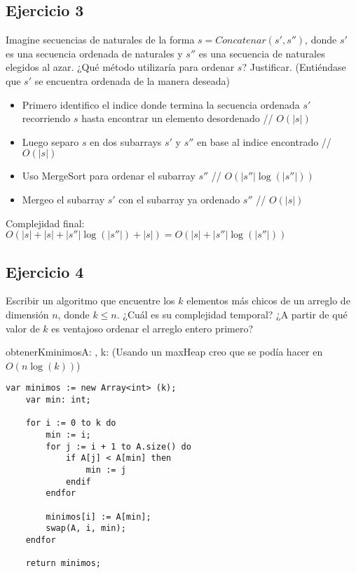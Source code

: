 \subsection{Ejercicio 3}
Imagine secuencias de naturales de la forma $s = Concatenar(s', s'')$, donde $s'$ es una secuencia ordenada de naturales y $s''$ es una secuencia de naturales elegidos al azar. ¿Qué método utilizaría para ordenar $s$? Justificar. (Entiéndase que $s'$ se encuentra ordenada de la manera deseada)

\begin{itemize}
    \item Primero identifico el indice donde termina la secuencia ordenada $s'$ recorriendo $s$ hasta encontrar un elemento desordenado // $O(|s|)$
    \item Luego separo $s$ en dos subarrays $s'$ y $s''$ en base al indice encontrado // $O(|s|)$
    \item Uso MergeSort para ordenar el subarray $s''$ // $O(|s''|\log(|s''|))$
    \item Mergeo el subarray $s'$ con el subarray ya ordenado $s''$ // $O(|s|)$
\end{itemize}

Complejidad final: $O(|s| + |s| + |s''|\log(|s''|) + |s|) = O(|s| + |s''|\log(|s''|))$

\subsection{Ejercicio 4}
Escribir un algoritmo que encuentre los $k$ elementos más chicos de un arreglo de dimensión $n$, donde $k \leq n$. ¿Cuál es su complejidad temporal? ¿A partir de qué valor de $k$ es ventajoso ordenar el arreglo entero primero?

\begin{proc}{obtenerKminimos}{\In A: \Array{\Int}, \In k: \Int}{\Array{\Int}}
    (Usando un maxHeap creo que se podía hacer en $O(n\log(k))$)
    \begin{lstlisting}[numbers=none,frame=none]
    var minimos := new Array<int> (k);
    var min: int;

    for i := 0 to k do
        min := i;
        for j := i + 1 to A.size() do
            if A[j] < A[min] then
                min := j
            endif
        endfor

        minimos[i] := A[min];
        swap(A, i, min);
    endfor

    return minimos;
    \end{lstlisting}
\end{proc}

